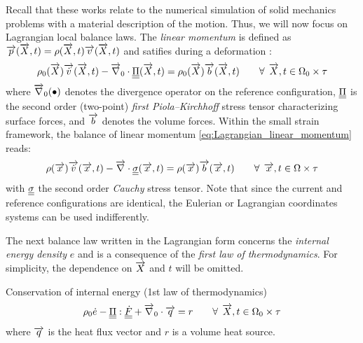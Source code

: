 Recall that these works relate to the numerical simulation of solid mechanics problems with a material description of the motion. Thus, we will now focus on Lagrangian local balance laws. The \textit{linear momentum} is defined as ${\overrightarrow{p}}({\overrightarrow{X}},t)=\rho({\overrightarrow{X}},t){\overrightarrow{v}}({\overrightarrow{X}},t)$ and satifies during a deformation \cite[Chapter~2]{Truesdell}:
\begin{equation}
  \label{eq:Lagrangian_linear_momentum}
  \rho_0({\overrightarrow{X}}) {\overrightarrow{\dot{v}}}({\overrightarrow{X}},t) - {\overrightarrow{\nabla}}_0 \cdot {\underline{\underline{\Pi}}}({\overrightarrow{X}},t) = \rho_0({\overrightarrow{X}}) {\overrightarrow{b}}({\overrightarrow{X}},t) \qquad \forall \: \: {\overrightarrow{X}},t \in \Omega_0 \times \tau 
\end{equation}
where ${\overrightarrow{\nabla}}_0 (\bullet)$ denotes the divergence operator on the reference configuration, ${\underline{\underline{\Pi}}}$ is the second order (two-point) \textit{first Piola--Kirchhoff} stress tensor characterizing surface forces, and ${\overrightarrow{b}}$ denotes the volume forces. Within the small strain framework, the balance of linear momentum \eqref{eq:Lagrangian_linear_momentum} reads:
\begin{equation}
  \label{eq:HPP_linear_momentum}
  \rho({\overrightarrow{x}}) {\overrightarrow{\dot{v}}}({\overrightarrow{x}},t) - {\overrightarrow{\nabla}} \cdot {\underline{\underline{\sigma}}}({\overrightarrow{x}},t) = \rho({\overrightarrow{x}}) {\overrightarrow{b}}({\overrightarrow{x}},t)  \qquad \forall \: \: {\overrightarrow{x}},t \in \Omega \times \tau 
\end{equation}
with ${\underline{\underline{\sigma}}}$ the second order \textit{Cauchy} stress tensor. Note that since the current and reference configurations are identical, the Eulerian or Lagrangian coordinates systems can be used indifferently.

The next balance law written in the Lagrangian form concerns the \textit{internal energy density} $e$ and is a consequence of the \textit{first law of thermodynamics}. For simplicity, the dependence on ${\overrightarrow{X}}$ and $t$ will be omitted.

Conservation of internal energy (1st law of thermodynamics)
\begin{equation}
  \label{eq:energy_balance}
  \rho_0 \dot{e} - {\underline{\underline{\Pi}}}:{\underline{\underline{\dot{F}}}} + {\overrightarrow{\nabla}}_0 \cdot {\overrightarrow{q}}= r \qquad \forall \: \: {\overrightarrow{X}},t \in \Omega_0 \times \tau 
\end{equation}
where ${\overrightarrow{q}}$ is the heat flux vector and $r$ is a volume heat source.
